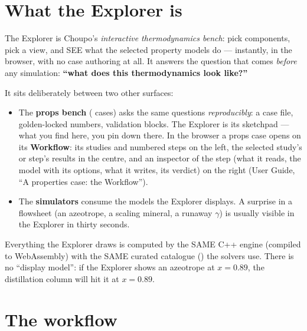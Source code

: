 \documentclass[11pt,a4paper]{article}
\title{}
\author{}
\date{}
\begin{document}

\section{What the Explorer is}

The Explorer is Choupo's \emph{interactive thermodynamics bench}: pick
components, pick a view, and SEE what the selected property models do ---
instantly, in the browser, with no case authoring at all.  It answers the
question that comes \emph{before} any simulation: \textbf{``what does this
thermodynamics look like?''}

It sits deliberately between two other surfaces:
\begin{itemize}[leftmargin=*,nosep]
  \item The \textbf{props bench} ( cases) asks the same
        questions \emph{reproducibly}: a case file, golden-locked numbers,
        validation blocks.  The Explorer is its sketchpad --- what you find
        here, you pin down there.  In the browser a props case opens on its
        \textbf{Workflow}: its studies and numbered steps on the left, the
        selected study's or step's results in the centre, and an inspector
        of the step (what it reads, the model with its options, what it
        writes, its verdict) on the right (User Guide, ``A properties case:
        the Workflow'').
  \item The \textbf{simulators} consume the models the Explorer displays.
        A surprise in a flowsheet (an azeotrope, a scaling mineral, a
        runaway $\gamma$) is usually visible in the Explorer in thirty
        seconds.
\end{itemize}

Everything the Explorer draws is computed by the SAME C++ engine
(compiled to WebAssembly) with the SAME curated catalogue
() the solvers use.  There is no ``display model'':
if the Explorer shows an azeotrope at $x = 0.89$, the distillation column
will hit it at $x = 0.89$.

\section{The workflow}
\end{document}

